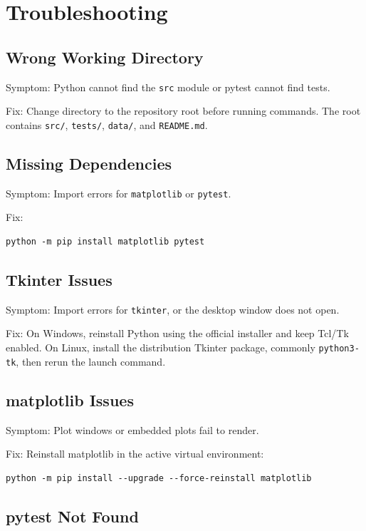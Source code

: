 \documentclass[11pt,a4paper]{article}
\begin{document}
\section{Troubleshooting}

\subsection{Wrong Working Directory}

Symptom: Python cannot find the \texttt{src} module or pytest cannot find tests.

Fix: Change directory to the repository root before running commands. The root contains \texttt{src/}, \texttt{tests/}, \texttt{data/}, and \texttt{README.md}.

\subsection{Missing Dependencies}

Symptom: Import errors for \texttt{matplotlib} or \texttt{pytest}.

Fix:
\begin{verbatim}
python -m pip install matplotlib pytest
\end{verbatim}

\subsection{Tkinter Issues}

Symptom: Import errors for \texttt{tkinter}, or the desktop window does not open.

Fix: On Windows, reinstall Python using the official installer and keep Tcl/Tk enabled. On Linux, install the distribution Tkinter package, commonly \texttt{python3-tk}, then rerun the launch command.

\subsection{matplotlib Issues}

Symptom: Plot windows or embedded plots fail to render.

Fix: Reinstall matplotlib in the active virtual environment:
\begin{verbatim}
python -m pip install --upgrade --force-reinstall matplotlib
\end{verbatim}

\subsection{pytest Not Found}
\end{document}
